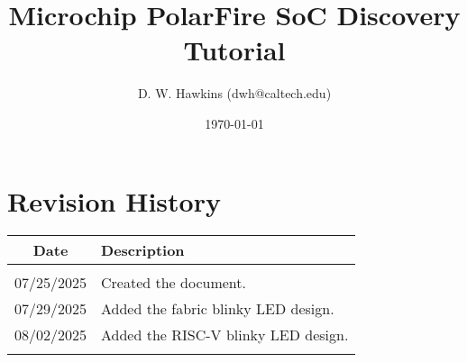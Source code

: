 \documentclass[10pt,twoside]{article}
\begin{document}
\title{Microchip PolarFire SoC Discovery Tutorial}
\author{D. W. Hawkins (dwh@caltech.edu)}
\date{\today}

\maketitle

\tableofcontents

\pagestyle{fancy}

\clearpage

%

\clearpage

\clearpage

\clearpage

\clearpage

\clearpage


\clearpage
\appendix

\clearpage
\section{Revision History}
%
\begin{table}[h]
\begin{center}
\begin{tabular}{|c|p{100mm}|}
\hline
Date & Description\\
\hline\hline
&\\
07/25/2025  & Created the document.\\
07/29/2025  & Added the fabric blinky LED design.\\
08/02/2025  & Added the RISC-V blinky LED design.\\
&\\
\hline
\end{tabular}
\end{center}
\end{table}

%
%



\end{document}
